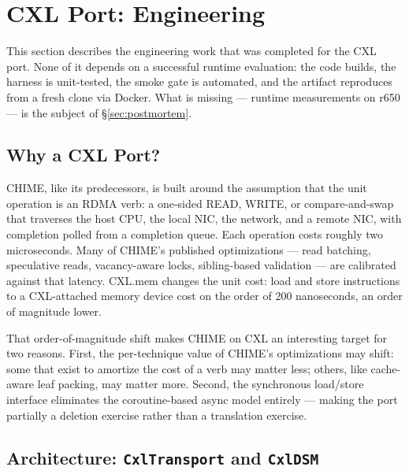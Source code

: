 \documentclass[11pt,a4paper]{article}
\begin{document}
\section{CXL Port: Engineering}
\label{sec:cxl-engineering}


This section describes the engineering work that was completed for the CXL port. None of it depends on a successful runtime evaluation: the code builds, the harness is unit-tested, the smoke gate is automated, and the artifact reproduces from a fresh clone via Docker. What is missing --- runtime measurements on r650 --- is the subject of §\ref{sec:postmortem}.

\subsection{Why a CXL Port?}

CHIME, like its predecessors, is built around the assumption that the unit operation is an RDMA verb: a one-sided READ, WRITE, or compare-and-swap that traverses the host CPU, the local NIC, the network, and a remote NIC, with completion polled from a completion queue. Each operation costs roughly two microseconds. Many of CHIME's published optimizations --- read batching, speculative reads, vacancy-aware locks, sibling-based validation --- are calibrated against that latency. CXL.mem changes the unit cost: load and store instructions to a CXL-attached memory device cost on the order of 200 nanoseconds, an order of magnitude lower.

That order-of-magnitude shift makes CHIME on CXL an interesting target for two reasons. First, the per-technique value of CHIME's optimizations may shift: some that exist to amortize the cost of a verb may matter less; others, like cache-aware leaf packing, may matter more. Second, the synchronous load/store interface eliminates the coroutine-based async model entirely --- making the port partially a deletion exercise rather than a translation exercise.

\subsection{Architecture: \texttt{CxlTransport} and \texttt{CxlDSM}}
\label{sec:cxl-arch}
\end{document}
